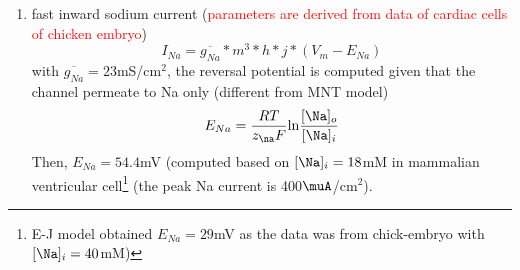 \begin{enumerate}
\item fast inward sodium current (\textcolor{red}{parameters are
    derived from data of cardiac cells of chicken embryo})
  \begin{equation}
    \label{eq:724}
    I_{Na}= \overline{g_{Na}} * m^3 * h * j * (V_m - E_{Na})
  \end{equation}
  with $\overline{g_{Na}}=23$mS/cm$^2$, the reversal potential is
  computed given that the channel permeate to Na only (different from
  MNT model)
  \begin{equation}
    \label{eq:744}
    E_{Na} = \frac{RT}{z_\na F}\ln\frac{[\Na]_o}{[\Na]_i}
  \end{equation}
  Then, $E_{Na}=54.4$mV (computed based on $[\Na]_i=18$mM in mammalian
  ventricular
  cell\footnote{ E-J model obtained $E_{Na}=29$mV as the data was from
    chick-embryo with $[\Na]_i=40$mM)}
  (the peak Na current is 400$\muA$/cm$^2$).


\end{enumerate}
